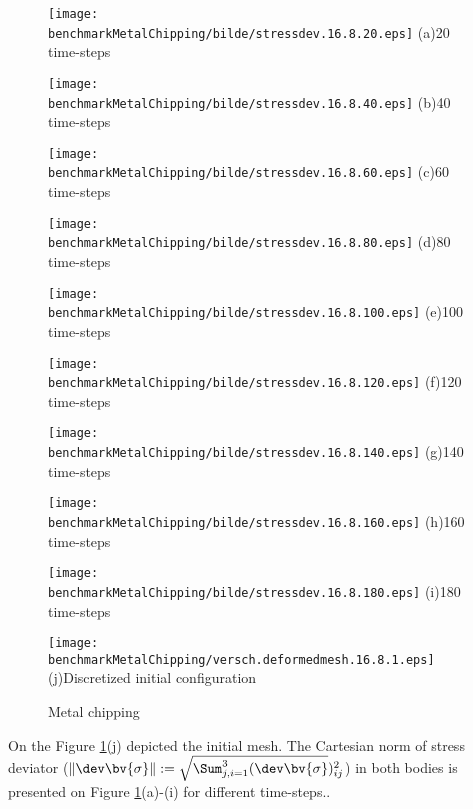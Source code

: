 
\begin{figure}[h]
\begin{minipage}[c]{6cm}
\texttt{[image: \\benchmarkMetalChipping/bilde/stressdev.16.8.20.eps]}
(a){20 time-steps}
\end{minipage}
\begin{minipage}[c]{6cm}
\texttt{[image: \\benchmarkMetalChipping/bilde/stressdev.16.8.40.eps]}
(b){40 time-steps}
\end{minipage}

\begin{minipage}[c]{6cm}
\texttt{[image: \\benchmarkMetalChipping/bilde/stressdev.16.8.60.eps]}
(c){60 time-steps}
\end{minipage}
\begin{minipage}[c]{6cm}
\texttt{[image: \\benchmarkMetalChipping/bilde/stressdev.16.8.80.eps]}
(d){80 time-steps}
\end{minipage}

\begin{minipage}[c]{6cm}
\texttt{[image: \\benchmarkMetalChipping/bilde/stressdev.16.8.100.eps]}
(e){100 time-steps}
\end{minipage}
\begin{minipage}[c]{6cm}
\texttt{[image: \\benchmarkMetalChipping/bilde/stressdev.16.8.120.eps]}
(f){120 time-steps}
\end{minipage}

\begin{minipage}[c]{6cm}
\texttt{[image: \\benchmarkMetalChipping/bilde/stressdev.16.8.140.eps]}
(g){140 time-steps}
\end{minipage}
\begin{minipage}[c]{6cm}
\texttt{[image: \\benchmarkMetalChipping/bilde/stressdev.16.8.160.eps]}
(h){160 time-steps}
\end{minipage}

\begin{minipage}[c]{6cm}
\texttt{[image: \\benchmarkMetalChipping/bilde/stressdev.16.8.180.eps]}
(i){180 time-steps}
\end{minipage}
\begin{minipage}[c]{6cm}
\texttt{[image: \\benchmarkMetalChipping/versch.deformedmesh.16.8.1.eps]}  
(j){Discretized initial configuration}
\end{minipage}
\caption{Metal chipping}\label{fig:MetalChipingEvolution}
\end{figure}

On the Figure \ref{fig:MetalChipingEvolution}(j) depicted the initial mesh. 
The  Cartesian norm of stress deviator ($\|\dev \bv{\sigma}\|:=\sqrt{\Sum_{j,i=1}^{3}(\dev \bv{\sigma}})^2_{ij}$) in both bodies is presented on Figure \ref{fig:MetalChipingEvolution}(a)-(i) for different time-steps.. 
